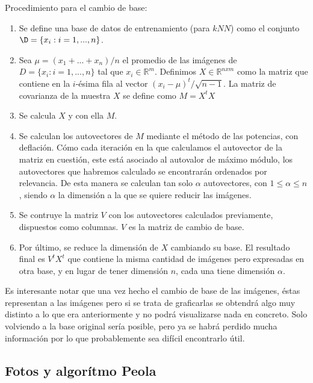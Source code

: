 \bigskip

Procedimiento para el cambio de base:

\begin{enumerate}
\item Se define una base de datos de entrenamiento (para $kNN$) como el conjunto $\D = \{x_i : i = 1, . . . , n\}$.
\item Sea $\mu = (x_1 + ... + x_n)/n$ el promedio de las imágenes de $D = \{x_i : i = 1, ..., n\}$ tal que $x_i\in\mathbb{R}^{m}$. Definimos $X\in\mathbb{R}^{nxm}$ como la matriz que contiene en la $i$-ésima fila al vector $(x_i - \mu)^t/  \sqrt{n-1}$. La matriz de covarianza de la muestra $X$ se define como $M = X^t X$
\item Se calcula $X$ y con ella $M$.
\item Se calculan los autovectores de $M$ mediante el método de las potencias, con deflación. Cómo cada iteración en la que calculamos el autovector de la matriz en cuestión, este está asociado al autovalor de máximo módulo, los autovectores que habremos calculado se encontrarán ordenados por relevancia. De esta manera se calculan tan solo $\alpha$ autovectores, con $1 \leq \alpha \leq n$, siendo $\alpha$ la dimensión a la que se quiere reducir las imágenes. 
\item Se contruye la matriz $V$ con los autovectores calculados previamente, dispuestos como columnas. $V$ es la matriz de cambio de base.
\item Por último, se reduce la dimensión de $X$ cambiando su base. El resultado final es $V^tX^t$ que contiene la misma cantidad de imágenes pero expresadas en otra base, y en lugar de tener dimensión $n$, cada una tiene dimensión $\alpha$.
\end{enumerate}\tabularnewline

Es interesante notar que una vez hecho el cambio de base de las imágenes, éstas representan a las imágenes pero si se trata de graficarlas se obtendrá algo muy distinto a lo que era anteriormente y no podrá visualizarse nada en concreto. Solo volviendo a la base original sería posible, pero ya se habrá perdido mucha información por lo que probablemente sea difícil encontrarlo útil.

\subsection{Fotos y algorítmo Peola}

